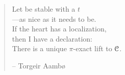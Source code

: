 


\vspace*{5cm}

\begin{verse}
    \hspace{2em}Let be stable with a $t$ \\
    \hspace{2em}---as nice as it needs to be. \\
    \hspace{2em}If the heart has a localization, \\
    \hspace{2em}then I have a declaration: \\
    \hspace{2em}There is a unique $\pi$-exact lift to $\EuScript{C}$. 

    \hspace{\fill}-- Torgeir Aambø
\end{verse}